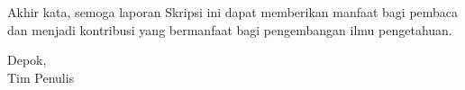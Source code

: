 Akhir kata, semoga laporan Skripsi ini dapat memberikan manfaat bagi pembaca dan menjadi kontribusi yang bermanfaat bagi pengembangan ilmu pengetahuan.


\vspace*{0.1cm}
\begin{flushright}
Depok, \tanggalSiapSidang\\[0.1cm]
\ifx\blank\npmDua
	\vspace*{1.5cm}
	\penulisSatu
\else
	Tim Penulis
\fi

\end{flushright}
